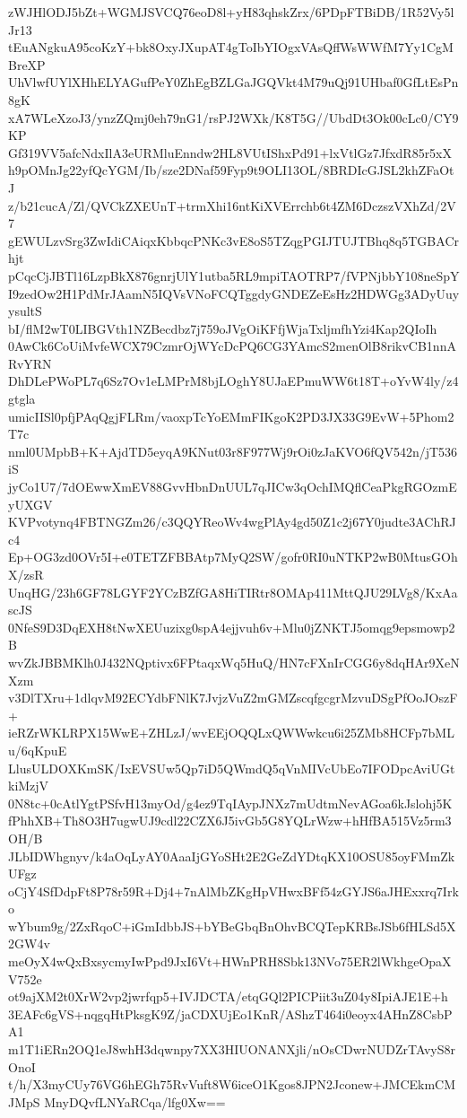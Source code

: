zWJHlODJ5bZt+WGMJSVCQ76eoD8l+yH83qhskZrx/6PDpFTBiDB/1R52Vy5lJr13
tEuANgkuA95coKzY+bk8OxyJXupAT4gToIbYIOgxVAsQffWsWWfM7Yy1CgMBreXP
UhVlwfUYlXHhELYAGufPeY0ZhEgBZLGaJGQVkt4M79uQj91UHbaf0GfLtEsPn8gK
xA7WLeXzoJ3/ynzZQmj0eh79nG1/rsPJ2WXk/K8T5G//UbdDt3Ok00cLc0/CY9KP
Gf319VV5afcNdxIlA3eURMluEnndw2HL8VUtIShxPd91+lxVtlGz7JfxdR85r5xX
h9pOMnJg22yfQcYGM/Ib/sze2DNaf59Fyp9t9OLI13OL/8BRDIcGJSL2khZFaOtJ
z/b21cucA/Zl/QVCkZXEUnT+trmXhi16ntKiXVErrchb6t4ZM6DczszVXhZd/2V7
gEWULzvSrg3ZwIdiCAiqxKbbqcPNKc3vE8oS5TZqgPGIJTUJTBhq8q5TGBACrhjt
pCqcCjJBTl16LzpBkX876gnrjUlY1utba5RL9mpiTAOTRP7/fVPNjbbY108neSpY
I9zedOw2H1PdMrJAamN5IQVsVNoFCQTggdyGNDEZeEsHz2HDWGg3ADyUuyysultS
bI/flM2wT0LIBGVth1NZBecdbz7j759oJVgOiKFfjWjaTxljmfhYzi4Kap2QIoIh
0AwCk6CoUiMvfeWCX79CzmrOjWYcDcPQ6CG3YAmcS2menOlB8rikvCB1nnARvYRN
DhDLePWoPL7q6Sz7Ov1eLMPrM8bjLOghY8UJaEPmuWW6t18T+oYvW4ly/z4gtgla
umicIISl0pfjPAqQgjFLRm/vaoxpTcYoEMmFIKgoK2PD3JX33G9EvW+5Phom2T7c
nml0UMpbB+K+AjdTD5eyqA9KNut03r8F977Wj9rOi0zJaKVO6fQV542n/jT536iS
jyCo1U7/7dOEwwXmEV88GvvHbnDnUUL7qJICw3qOchIMQflCeaPkgRGOzmEyUXGV
KVPvotynq4FBTNGZm26/c3QQYReoWv4wgPlAy4gd50Z1c2j67Y0judte3AChRJc4
Ep+OG3zd0OVr5I+e0TETZFBBAtp7MyQ2SW/gofr0RI0uNTKP2wB0MtusGOhX/zsR
UnqHG/23h6GF78LGYF2YCzBZfGA8HiTIRtr8OMAp411MttQJU29LVg8/KxAascJS
0NfeS9D3DqEXH8tNwXEUuzixg0spA4ejjvuh6v+Mlu0jZNKTJ5omqg9epsmowp2B
wvZkJBBMKlh0J432NQptivx6FPtaqxWq5HuQ/HN7cFXnIrCGG6y8dqHAr9XeNXzm
v3DlTXru+1dlqvM92ECYdbFNlK7JvjzVuZ2mGMZscqfgcgrMzvuDSgPfOoJOszF+
ieRZrWKLRPX15WwE+ZHLzJ/wvEEjOQQLxQWWwkcu6i25ZMb8HCFp7bMLu/6qKpuE
LlusULDOXKmSK/IxEVSUw5Qp7iD5QWmdQ5qVnMIVcUbEo7IFODpcAviUGtkiMzjV
0N8tc+0cAtlYgtPSfvH13myOd/g4ez9TqIAypJNXz7mUdtmNevAGoa6kJslohj5K
fPhhXB+Th8O3H7ugwUJ9cdl22CZX6J5ivGb5G8YQLrWzw+hHfBA515Vz5rm3OH/B
JLbIDWhgnyv/k4aOqLyAY0AaaIjGYoSHt2E2GeZdYDtqKX10OSU85oyFMmZkUFgz
oCjY4SfDdpFt8P78r59R+Dj4+7nAlMbZKgHpVHwxBFf54zGYJS6aJHExxrq7Irko
wYbum9g/2ZxRqoC+iGmIdbbJS+bYBeGbqBnOhvBCQTepKRBsJSb6fHLSd5X2GW4v
meOyX4wQxBxsycmyIwPpd9JxI6Vt+HWnPRH8Sbk13NVo75ER2lWkhgeOpaXV752e
ot9ajXM2t0XrW2vp2jwrfqp5+IVJDCTA/etqGQl2PICPiit3uZ04y8IpiAJE1E+h
3EAFc6gVS+nqgqHtPksgK9Z/jaCDXUjEo1KnR/AShzT464i0eoyx4AHnZ8CsbPA1
m1T1iERn2OQ1eJ8whH3dqwnpy7XX3HIUONANXjli/nOsCDwrNUDZrTAvyS8rOnoI
t/h/X3myCUy76VG6hEGh75RvVuft8W6iceO1Kgos8JPN2Jconew+JMCEkmCMJMpS
MnyDQvfLNYaRCqa/lfg0Xw==
